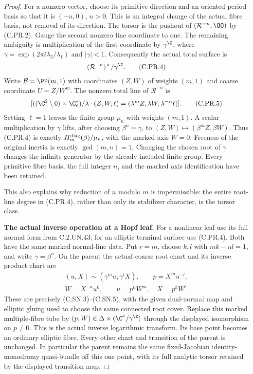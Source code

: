 \begin{proof}
For a nonzero vector, choose its primitive direction and an
oriented period basis so that it is $(-n,0)$, $n>0$. This is
an integral change of the actual fibre basis, not removal of
its direction. The torsor is the pushout of
$(\mathcal R^{-n},\OO)$ by (C.PR.2). Gauge the second nonzero
line coordinate to one. The remaining ambiguity is multiplication
of the first coordinate by
$\gamma^{\Z}$, where
$\gamma=\exp(2\pi i\lambda_2/\lambda_1)$ and $|\gamma|<1$.
Consequently the actual total surface is
\[
                         (\mathcal R^{-n})^\times/\gamma^{\Z}.
                                                        \tag{C.PR.4}
\]
Write $\mathcal B=\PP(m,1)$ with coordinates $(Z,W)$ of
weights $(m,1)$ and coarse coordinate $U=Z/W^m$.
The nonzero total line of $\mathcal R^{-n}$ is
\[
 [((\C^2\setminus0)\times\C^*_\ell)/
              \lambda\cdot(Z,W,\ell)
                =(\lambda^mZ,\lambda W,\lambda^{-n}\ell)].
                                                        \tag{C.PR.5}
\]
Setting $\ell=1$ leaves the finite group $\mu_n$ with weights
$(m,1)$. A scalar multiplication by $\gamma$ lifts, after choosing
$\beta^n=\gamma$, to $(Z,W)\mapsto(\beta^mZ,\beta W)$.
Thus (C.PR.4) is exactly
$H_m^{\rm diag}(\beta)/\mu_n$, with the marked axis $W=0$.
Freeness of the original inertia is exactly
$\gcd(m,n)=1$. Changing the chosen root of $\gamma$ changes
the infinite generator by the already included finite group.
Every primitive fibre basis, the full integer $n$, and the marked
axis identification have been retained.

This also explains why reduction of $n$ modulo $m$ is impermissible:
the entire root-line degree in (C.PR.4), rather than only its
stabilizer character, is the torsor class.

\par\medskip\noindent\textbf{The actual inverse operation at a Hopf leaf.}
For a nonlinear leaf use its full normal form from C.2.UN.43;
for an elliptic terminal surface use (C.PR.4). Both have the
same marked normal-line data. Put $r=m$, choose $k,l$ with
$mk-nl=1$, and write $\gamma=\beta^n$. On the parent the
actual coarse root chart and its inverse product chart are
\[
 \begin{gathered}
 (u,X)\sim(\gamma^m u,\gamma^lX),\qquad p=X^m u^{-l},\\
 W=X^{-n}u^k,\qquad
                u=p^nW^m,\quad X=p^kW^l.
 \end{gathered}                                        \tag{C.PR.6}
\]
These are precisely (C.SN.3)--(C.SN.5), with the given dual-normal
map and elliptic gluing used to choose the same connected root
cover. Replace this marked multiple-fibre tube by
$(p,W)\in\Delta\times(\C^*/\gamma^{\Z})$ through the displayed
isomorphism on $p\ne0$. This is the actual inverse logarithmic
transform. Its base point becomes an ordinary elliptic fibre.
Every other chart and transition of the parent is unchanged.
In particular the parent remains the same fixed-Jacobian
identity-monodromy quasi-bundle off this one point, with its full
analytic torsor retained by the displayed transition map.


\end{proof}
